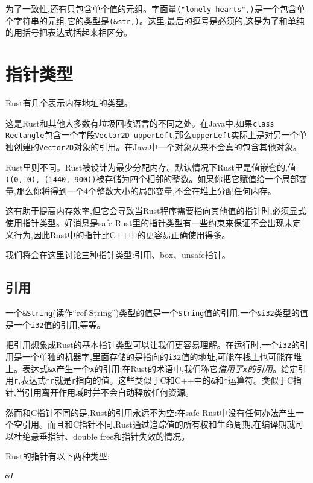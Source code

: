 为了一致性,还有只包含单个值的元组。字面量\texttt{("lonely hearts",)}是一个包含单个字符串的元组,它的类型是\texttt{(\&str,)}。这里,最后的逗号是必须的,这是为了和单纯的用括号把表达式括起来相区分。

\section{指针类型}
Rust有几个表示内存地址的类型。

这是Rust和其他大多数有垃圾回收语言的不同之处。在Java中,如果\texttt{class Rectangle}包含一个字段\texttt{Vector2D upperLeft},那么\texttt{upperLeft}实际上是对另一个单独创建的\texttt{Vector2D}对象的引用。在Java中一个对象从来不会真的包含其他对象。

Rust里则不同。Rust被设计为最少分配内存。默认情况下Rust里是值嵌套的,值\texttt{((0, 0), (1440, 900))}被存储为四个相邻的整数。如果你把它赋值给一个局部变量,那么你将得到一个4个整数大小的局部变量,不会在堆上分配任何内存。

这有助于提高内存效率,但它会导致当Rust程序需要指向其他值的指针时,必须显式使用指针类型。好消息是safe Rust里的指针类型有一些约束来保证不会出现未定义行为,因此Rust中的指针比C++中的更容易正确使用得多。

我们将会在这里讨论三种指针类型:引用、box、unsafe指针。

\subsection{引用}

一个\texttt{\&String}(读作“ref String”)类型的值是一个\texttt{String}值的引用,一个\texttt{\&i32}类型的值是一个\texttt{i32}值的引用,等等。

把引用想象成Rust的基本指针类型可以让我们更容易理解。在运行时,一个\texttt{i32}的引用是一个单独的机器字,里面存储的是指向的\texttt{i32}值的地址,可能在栈上也可能在堆上。表达式\texttt{\&x}产生一个\texttt{x}的引用;在Rust的术语中,我们称它\emph{借用了\texttt{x}的引用}。给定引用\texttt{r},表达式\texttt{*r}就是\texttt{r}指向的值。这些类似于C和C++中的\texttt{\&}和\texttt{*}运算符。类似于C指针,当引用离开作用域时并不会自动释放任何资源。

然而和C指针不同的是,Rust的引用永远不为空:在safe Rust中没有任何办法产生一个空引用。而且和C指针不同,Rust通过追踪值的所有权和生命周期,在编译期就可以杜绝悬垂指针、double free和指针失效的情况。

Rust的指针有以下两种类型:
\begin{flushleft}
    \emph{\texttt{\&T}}
\end{flushleft}

